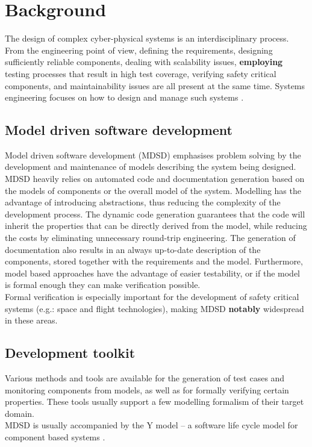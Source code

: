 \chapter{Background}
\label{chap:background}

The design of complex cyber-physical systems is an interdisciplinary process. From the engineering point of view, defining the requirements, designing sufficiently reliable components, dealing with scalability issues, \textbf{employing} testing processes that result in high test coverage, verifying safety critical components, and maintainability issues are all present at the same time. Systems engineering focuses on how to design and manage such systems \cite{randomwikipedialink1} \cite{randomwikipedialink2}. 
\section{Model driven software development}
Model driven software development (MDSD) emphasises problem solving by the development and maintenance of models describing the system being designed. MDSD heavily relies on automated code and documentation generation based on the models of components or the overall model of the system. Modelling has the advantage of introducing abstractions, thus reducing the complexity of the development process. The dynamic code generation guarantees that the code will inherit the properties that can be directly derived from the model, while reducing the costs by eliminating unnecessary round-trip engineering. The generation of documentation also results in an always up-to-date description of the components, stored together with the requirements and the model. Furthermore, model based approaches have the advantage of easier testability, or if the model is formal enough they can make verification possible.\\
Formal verification is especially important for the development of safety critical systems (e.g.: space and flight technologies), making MDSD \textbf{notably} widespread in these areas.
\section{Development toolkit}
Various methods and tools are available for the generation of test cases and monitoring components from models, as well as for formally verifying certain properties. These tools usually support a few modelling formalism of their target domain.\\
MDSD is usually accompanied by the Y model -- a software life cycle model for component based systems \cite{ymodel}.
